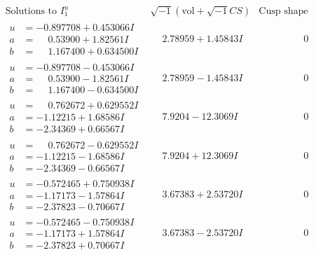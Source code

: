 \documentclass[1p]{elsarticle_modified}
\theoremstyle{definition}
\newcommand{\I}{\sqrt{-1}}
\begin{document}
$$\begin{array}{c|c|c}  
\text{Solutions to }I^u_{1}& \I (\text{vol} + \sqrt{-1}CS) & \text{Cusp shape}\\
 \hline 
\begin{aligned}
u &= -0.897708 + 0.453066 I \\
a &= \phantom{-}0.53900 + 1.82561 I \\
b &= \phantom{-}1.167400 + 0.634500 I\end{aligned}
 & \phantom{-}2.78959 + 1.45843 I & \phantom{-0.000000 } 0 \\ \hline\begin{aligned}
u &= -0.897708 - 0.453066 I \\
a &= \phantom{-}0.53900 - 1.82561 I \\
b &= \phantom{-}1.167400 - 0.634500 I\end{aligned}
 & \phantom{-}2.78959 - 1.45843 I & \phantom{-0.000000 } 0 \\ \hline\begin{aligned}
u &= \phantom{-}0.762672 + 0.629552 I \\
a &= -1.12215 + 1.68586 I \\
b &= -2.34369 + 0.66567 I\end{aligned}
 & \phantom{-}7.9204 - 12.3069 I & \phantom{-0.000000 } 0 \\ \hline\begin{aligned}
u &= \phantom{-}0.762672 - 0.629552 I \\
a &= -1.12215 - 1.68586 I \\
b &= -2.34369 - 0.66567 I\end{aligned}
 & \phantom{-}7.9204 + 12.3069 I & \phantom{-0.000000 } 0 \\ \hline\begin{aligned}
u &= -0.572465 + 0.750938 I \\
a &= -1.17173 - 1.57864 I \\
b &= -2.37823 - 0.70667 I\end{aligned}
 & \phantom{-}3.67383 + 2.53720 I & \phantom{-0.000000 } 0 \\ \hline\begin{aligned}
u &= -0.572465 - 0.750938 I \\
a &= -1.17173 + 1.57864 I \\
b &= -2.37823 + 0.70667 I\end{aligned}
 & \phantom{-}3.67383 - 2.53720 I & \phantom{-0.000000 } 0 \\ \hline\begin{aligned}

\end{aligned}
\end{array}$$
\end{document}
